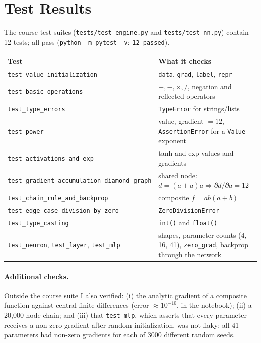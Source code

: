 \documentclass[11pt,a4paper]{article}
\begin{document}
\section{Test Results}
The course test suites (\texttt{tests/test\_engine.py} and \texttt{tests/test\_nn.py}) contain 12 tests; all pass (\texttt{python -m pytest -v}: \texttt{12 passed}).
\begin{center}
{\footnotesize
\begin{tabular}{p{7cm}p{8cm}}
\toprule
Test & What it checks \\
\midrule
\texttt{test\_value\_initialization} & \texttt{data}, \texttt{grad}, \texttt{label}, \texttt{repr} \\
\texttt{test\_basic\_operations} & $+,-,\times,/$, negation and reflected operators \\
\texttt{test\_type\_errors} & \texttt{TypeError} for strings/lists \\
\texttt{test\_power} & value, gradient $=12$, \texttt{AssertionError} for a \texttt{Value} exponent \\
\texttt{test\_activations\_and\_exp} & tanh and exp values and gradients \\
\texttt{test\_gradient\_accumulation\_diamond\_graph} & shared node: $d=(a+a)a\Rightarrow \partial d/\partial a=12$ \\
\texttt{test\_chain\_rule\_and\_backprop} & composite $f=ab(a+b)$ \\
\texttt{test\_edge\_case\_division\_by\_zero} & \texttt{ZeroDivisionError} \\
\texttt{test\_type\_casting} & \texttt{int()} and \texttt{float()} \\
\texttt{test\_neuron}, \texttt{test\_layer}, \texttt{test\_mlp} & shapes, parameter counts (4, 16, 41), \texttt{zero\_grad}, backprop through the network \\
\bottomrule
\end{tabular}}
\end{center}
\paragraph{Additional checks.} Outside the course suite I also verified: (i) the analytic gradient of a composite function against central finite differences (error $\approx10^{-10}$, in the notebook); (ii) a 20{,}000-node chain; and (iii) that \texttt{test\_mlp}, which asserts that every parameter receives a non-zero gradient after random initialization, was not flaky: all 41 parameters had non-zero gradients for each of 3000 different random seeds.
\end{document}
